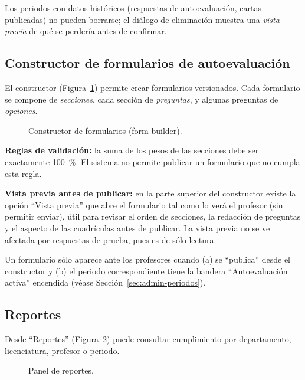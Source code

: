 \documentclass{computacion}
\begin{document}
Los periodos con datos históricos (respuestas de autoevaluación, cartas publicadas) no pueden borrarse; el diálogo de eliminación muestra una \emph{vista previa} de qué se perdería antes de confirmar.

\subsection{Constructor de formularios de autoevaluación}

El constructor (Figura~\ref{fig:m-admin-builder}) permite crear formularios versionados. Cada formulario se compone de \emph{secciones}, cada sección de \emph{preguntas}, y algunas preguntas de \emph{opciones}.

\begin{figure}[!ht]
    \centering
    \caption{Constructor de formularios (form-builder).}
    \label{fig:m-admin-builder}
\end{figure}

\textbf{Reglas de validación:} la suma de los pesos de las secciones debe ser exactamente 100~\%. El sistema no permite publicar un formulario que no cumpla esta regla.

\textbf{Vista previa antes de publicar:} en la parte superior del constructor existe la opción ``Vista previa'' que abre el formulario tal como lo verá el profesor (sin permitir enviar), útil para revisar el orden de secciones, la redacción de preguntas y el aspecto de las cuadrículas antes de publicar. La vista previa no se ve afectada por respuestas de prueba, pues es de sólo lectura.

Un formulario sólo aparece ante los profesores cuando (a) se ``publica'' desde el constructor y (b) el periodo correspondiente tiene la bandera ``Autoevaluación activa'' encendida (véase Sección~\ref{sec:admin-periodos}).

\subsection{Reportes}

Desde ``Reportes'' (Figura~\ref{fig:m-admin-rep}) puede consultar cumplimiento por departamento, licenciatura, profesor o periodo.

\begin{figure}[!ht]
    \centering
    \caption{Panel de reportes.}
    \label{fig:m-admin-rep}
\end{figure}
\end{document}
